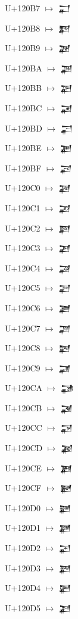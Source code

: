 {\noindent U+120B7  $\mapsto$ {\cufont 𒂷}\par
\noindent U+120B8  $\mapsto$ {\cufont 𒂸}\par
\noindent U+120B9  $\mapsto$ {\cufont 𒂹}\par
\noindent U+120BA  $\mapsto$ {\cufont 𒂺}\par
\noindent U+120BB  $\mapsto$ {\cufont 𒂻}\par
\noindent U+120BC  $\mapsto$ {\cufont 𒂼}\par
\noindent U+120BD  $\mapsto$ {\cufont 𒂽}\par
\noindent U+120BE  $\mapsto$ {\cufont 𒂾}\par
\noindent U+120BF  $\mapsto$ {\cufont 𒂿}\par
\noindent U+120C0  $\mapsto$ {\cufont 𒃀}\par
\noindent U+120C1  $\mapsto$ {\cufont 𒃁}\par
\noindent U+120C2  $\mapsto$ {\cufont 𒃂}\par
\noindent U+120C3  $\mapsto$ {\cufont 𒃃}\par
\noindent U+120C4  $\mapsto$ {\cufont 𒃄}\par
\noindent U+120C5  $\mapsto$ {\cufont 𒃅}\par
\noindent U+120C6  $\mapsto$ {\cufont 𒃆}\par
\noindent U+120C7  $\mapsto$ {\cufont 𒃇}\par
\noindent U+120C8  $\mapsto$ {\cufont 𒃈}\par
\noindent U+120C9  $\mapsto$ {\cufont 𒃉}\par
\noindent U+120CA  $\mapsto$ {\cufont 𒃊}\par
\noindent U+120CB  $\mapsto$ {\cufont 𒃋}\par
\noindent U+120CC  $\mapsto$ {\cufont 𒃌}\par
\noindent U+120CD  $\mapsto$ {\cufont 𒃍}\par
\noindent U+120CE  $\mapsto$ {\cufont 𒃎}\par
\noindent U+120CF  $\mapsto$ {\cufont 𒃏}\par
\noindent U+120D0  $\mapsto$ {\cufont 𒃐}\par
\noindent U+120D1  $\mapsto$ {\cufont 𒃑}\par
\noindent U+120D2  $\mapsto$ {\cufont 𒃒}\par
\noindent U+120D3  $\mapsto$ {\cufont 𒃓}\par
\noindent U+120D4  $\mapsto$ {\cufont 𒃔}\par
\noindent U+120D5  $\mapsto$ {\cufont 𒃕}\par
}
